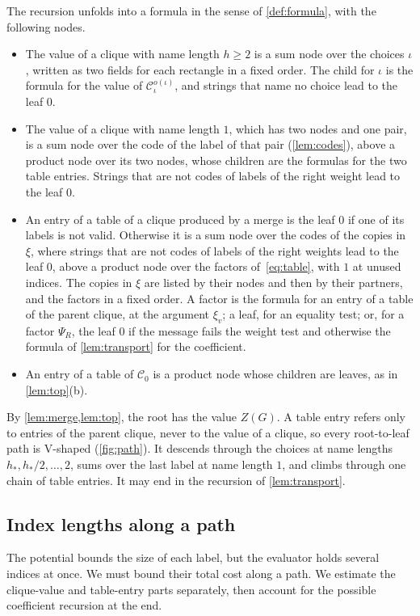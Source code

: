 \documentclass[11pt]{article}
\theoremstyle{definition}
\theoremstyle{definition}
\theoremstyle{remark}
\begin{document}
The recursion unfolds into a formula in the sense of \cref{def:formula}, with the following nodes.
\begin{itemize}[itemsep=1pt]
\item The value of a clique with name length $h\ge2$ is a sum node over the choices $\iota$, written as two fields for each rectangle in a fixed order. The child for $\iota$ is the formula for the value of $\mathcal C^{o(\iota)}_\iota$, and strings that name no choice lead to the leaf $0$.
\item The value of a clique with name length $1$, which has two nodes and one pair, is a sum node over the code of the label of that pair (\cref{lem:codes}), above a product node over its two nodes, whose children are the formulas for the two table entries. Strings that are not codes of labels of the right weight lead to the leaf $0$.
\item An entry of a table of a clique produced by a merge is the leaf $0$ if one of its labels is not valid. Otherwise it is a sum node over the codes of the copies in $\xi$, where strings that are not codes of labels of the right weights lead to the leaf $0$, above a product node over the factors of~\eqref{eq:table}, with $1$ at unused indices. The copies in $\xi$ are listed by their nodes and then by their partners, and the factors in a fixed order. A factor is the formula for an entry of a table of the parent clique, at the argument $\xi_v$; a leaf, for an equality test; or, for a factor $\Psi_R$, the leaf $0$ if the message fails the weight test and otherwise the formula of \cref{lem:transport} for the coefficient.
\item An entry of a table of $\mathcal C_0$ is a product node whose children are leaves, as in \cref{lem:top}(b).
\end{itemize}
By \cref{lem:merge,lem:top}, the root has the value $Z(G)$. A table entry refers only to entries of the parent clique, never to the value of a clique, so every root-to-leaf path is V-shaped (\cref{fig:path}). It descends through the choices at name lengths $h_*,h_*/2,\dots,2$, sums over the last label at name length $1$, and climbs through one chain of table entries. It may end in the recursion of \cref{lem:transport}.

\subsection{Index lengths along a path}\label{sec:indexlengths}

The potential bounds the size of each label, but the evaluator holds several indices at once. We must bound their total cost along a path. We estimate the clique-value and table-entry parts separately, then account for the possible coefficient recursion at the end.
\end{document}
